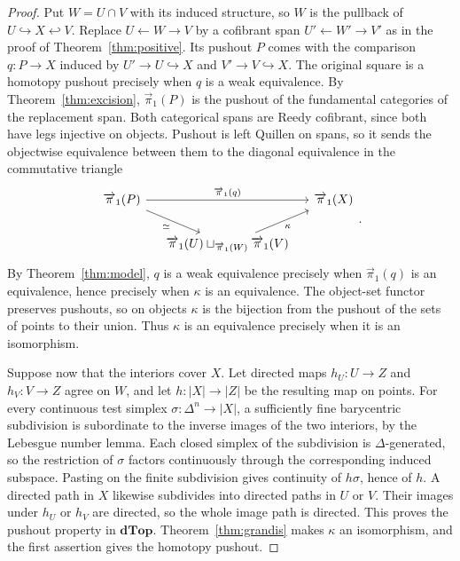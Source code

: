 \documentclass[12pt,a4paper]{amsart}
\theoremstyle{definition}
\renewcommand{\vec}{\overrightarrow}
\newcommand{\D}{\mathbf{dTop}}
\newcommand{\abs}[1]{\lvert#1\rvert}
\newcommand{\PiC}{\vec{\pi}_1}
\begin{document}
\begin{proof}
Put $W=U\cap V$ with its induced structure, so $W$ is the pullback of $U\hookrightarrow X\hookleftarrow V$. Replace $U\leftarrow W\to V$ by a cofibrant span $U'\leftarrow W'\to V'$ as in the proof of Theorem~\ref{thm:positive}. Its pushout $P$ comes with the comparison $q\colon P\to X$ induced by $U'\to U\hookrightarrow X$ and $V'\to V\hookrightarrow X$. The original square is a homotopy pushout precisely when $q$ is a weak equivalence. By Theorem~\ref{thm:excision}, $\PiC(P)$ is the pushout of the fundamental categories of the replacement span. Both categorical spans are Reedy cofibrant, since both have legs injective on objects. Pushout is left Quillen on spans, so it sends the objectwise equivalence between them to the diagonal equivalence in the commutative triangle
\[
\begin{tikzcd}[column sep=small]
 \PiC(P)\ar[rr,"\PiC(q)"]\ar[dr,"\simeq"']&&\PiC(X)\\
 &\PiC(U)\sqcup_{\PiC(W)}\PiC(V)\ar[ur,"\kappa"']&
\end{tikzcd}.
\]
By Theorem~\ref{thm:model}, $q$ is a weak equivalence precisely when $\PiC(q)$ is an equivalence, hence precisely when $\kappa$ is an equivalence. The object-set functor preserves pushouts, so on objects $\kappa$ is the bijection from the pushout of the sets of points to their union. Thus $\kappa$ is an equivalence precisely when it is an isomorphism.

Suppose now that the interiors cover $X$. Let directed maps $h_U\colon U\to Z$ and $h_V\colon V\to Z$ agree on $W$, and let $h\colon\abs X\to\abs Z$ be the resulting map on points. For every continuous test simplex $\sigma\colon\Delta^n\to\abs X$, a sufficiently fine barycentric subdivision is subordinate to the inverse images of the two interiors, by the Lebesgue number lemma. Each closed simplex of the subdivision is $\Delta$-generated, so the restriction of $\sigma$ factors continuously through the corresponding induced subspace. Pasting on the finite subdivision gives continuity of $h\sigma$, hence of $h$. A directed path in $X$ likewise subdivides into directed paths in $U$ or $V$. Their images under $h_U$ or $h_V$ are directed, so the whole image path is directed. This proves the pushout property in $\D$. Theorem~\ref{thm:grandis} makes $\kappa$ an isomorphism, and the first assertion gives the homotopy pushout.
\end{proof}
\end{document}

